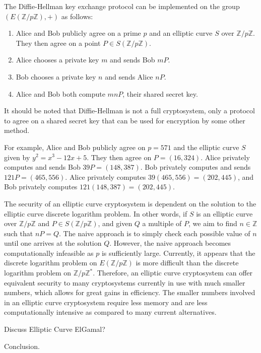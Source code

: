 \documentclass{article}
\begin{document}
\indent The Diffie-Hellman key exchange protocol can be implemented on the group $(E(\mathbb{Z}/p\mathbb{Z}), +)$ as follows:
\begin{enumerate}
\item Alice and Bob publicly agree on a prime $p$ and an elliptic curve $S$ over $\mathbb{Z}/p\mathbb{Z}$. They then agree on a point $P \in S(\mathbb{Z}/p\mathbb{Z})$.
\item Alice chooses a private key $m$ and sends Bob $mP$.
\item Bob chooses a private key $n$ and sends Alice $nP$.
\item Alice and Bob both compute $mnP$, their shared secret key.
\end{enumerate}
It should be noted that Diffie-Hellman is not a full cryptosystem, only a protocol to agree on a shared secret key that can be used for encryption by some other method.

\indent For example, Alice and Bob publicly agree on $p=571$ and the elliptic curve $S$ given by $y^2=x^3-12x+5$. They then agree on $P=(16,324)$. Alice privately computes and sends Bob $39P=(148,387)$. Bob privately computes and sends $121P=(465,556)$. Alice privately computes $39(465,556)=(202,445)$, and Bob privately computes $121(148,387)=(202,445)$.

\indent The security of an elliptic curve cryptosystem is dependent on the solution to the elliptic curve discrete logarithm problem. In other words, if $S$ is an elliptic curve over $\mathbb{Z}/p\mathbb{Z}$ and $P \in S(\mathbb{Z}/p\mathbb{Z})$, and given $Q$ a multiple of $P$, we aim to find $n\in\mathbb{Z}$ such that $nP=Q$. The naive approach is to simply check each possible value of $n$ until one arrives at the solution $Q$. However, the naive approach becomes computationally infeasible as $p$ is sufficiently large. Currently, it appears that the discrete logarithm problem on $E(\mathbb{Z}/p\mathbb{Z})$ is more difficult than the discrete logarithm problem on $\mathbb{Z}/p\mathbb{Z}^*$. Therefore, an elliptic curve cryptosystem can offer equivalent security to many cryptosystems currently in use with much smaller numbers, which allows for great gains in efficiency. The smaller numbers involved in an elliptic curve cryptosystem require less memory and are less computationally intensive as compared to many current alternatives.

\indent Discuss Elliptic Curve ElGamal?

\indent Conclusion.
\end{document}

